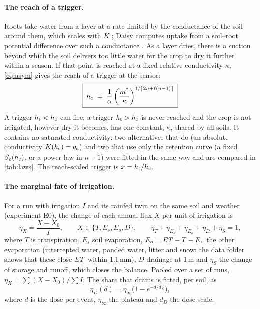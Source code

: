 \paragraph{The reach of a trigger.}
Roots take water from a layer at a rate limited by the conductance of the soil around them, which scales with $K$ \citep{Gardner1960,Carminati2020}; Daisy computes uptake from a soil--root potential difference over such a conductance \citep{Hansen1990,Abrahamsen2000}. As a layer dries, there is a suction beyond which the soil delivers too little water for the crop to dry it further within a season. If that point is reached at a fixed relative conductivity $\kappa$, \cref{eq:asym} gives the reach of a trigger at the sensor:
\begin{equation}
\boxed{\;h_{\mathrm{c}} \;=\; \frac{1}{\alpha}\left(\frac{m^{2}}{\kappa}\right)^{1/[\,2n+\ell(n-1)\,]}\;}
\label{eq:hc}
\end{equation}
A trigger $h_{\mathrm{t}}<h_{\mathrm{c}}$ can fire; a trigger $h_{\mathrm{t}}>h_{\mathrm{c}}$ is never reached and the crop is not irrigated, however dry it becomes.  has one constant, $\kappa$, shared by all soils. It contains no saturated conductivity: two alternatives that do (an absolute conductivity $K(h_{\mathrm{c}})=q_c$) and two that use only the retention curve (a fixed $S_e(h_{\mathrm{c}})$, or a power law in $n-1$) were fitted in the same way and are compared in \cref{tab:laws}. The reach-scaled trigger is $x=h_{\mathrm{t}}/h_{\mathrm{c}}$.

\paragraph{The marginal fate of irrigation.}
For a run with irrigation $I$ and its rainfed twin on the same soil and weather (experiment E0), the change of each annual flux $X$ per unit of irrigation is
\begin{equation}
\eta_X=\frac{X-X_{0}}{I},\qquad X\in\{T,E_s,E_o,D\},\qquad \eta_T+\eta_{E_s}+\eta_{E_o}+\eta_D+\eta_S=1,
\label{eq:eta}
\end{equation}
where $T$ is transpiration, $E_s$ soil evaporation, $E_o=\mathit{ET}-T-E_s$ the other evaporation (intercepted water, ponded water, litter and snow; the data folder shows that these close $\mathit{ET}$ within 1.1\,mm), $D$ drainage at 1\,m and $\eta_S$ the change of storage and runoff, which closes the balance. Pooled over a set of runs, $\eta_X=\sum(X-X_0)/\sum I$. The share that drains is fitted, per soil, as
\begin{equation}
\eta_D(d)=\eta_\infty\bigl(1-e^{-d/d_D}\bigr),
\label{eq:dose}
\end{equation}
where $d$ is the dose per event, $\eta_\infty$ the plateau and $d_D$ the dose scale.

